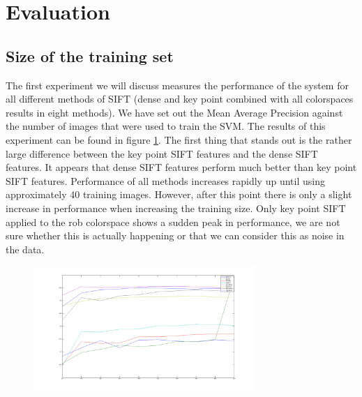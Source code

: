 \documentclass[11pt]{article}
\begin{document}
\section{Evaluation}

\subsection{Size of the training set}
\label{train}
The first experiment we will discuss measures the performance of the system for all different methods of SIFT (dense and key point combined with all colorspaces results in eight methods). We have set out the Mean Average Precision against the number of images that were used to train the SVM. The results of this experiment can be found in figure \ref{trainingSizes}. The first thing that stands out is the rather large difference between the key point SIFT features and the dense SIFT features. It appears that dense SIFT features perform much better than key point SIFT features. Performance of all methods increases rapidly up until using approximately 40 training images. However, after this point there is only a slight increase in performance when increasing the training size. Only key point SIFT applied to the rob colorspace shows a sudden peak in performance, we are not sure whether this is actually happening or that we can consider this as noise in the data. 
\begin{figure}[H]
  \centering
    \includegraphics[width=0.75\textwidth]{trainingSizes}
      \caption{}
      \label{trainingSizes}
\end{figure}
\end{document}
